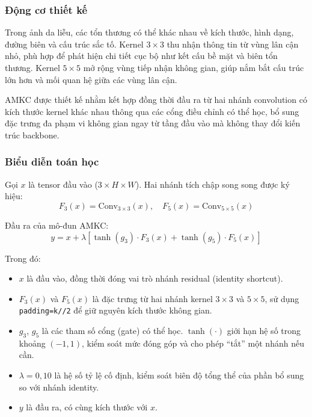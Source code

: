 \subsubsection{Động cơ thiết kế}

Trong ảnh da liễu, các tổn thương có thể khác nhau về kích thước, hình dạng, đường biên và cấu trúc sắc tố. Kernel $3\times3$ thu nhận thông tin từ vùng lân cận nhỏ, phù hợp để phát hiện chi tiết cục bộ như kết cấu bề mặt và biên tổn thương. Kernel $5\times5$ mở rộng vùng tiếp nhận không gian, giúp nắm bắt cấu trúc lớn hơn và mối quan hệ giữa các vùng lân cận.

AMKC được thiết kế nhằm kết hợp đồng thời đầu ra từ hai nhánh convolution có kích thước kernel khác nhau thông qua các cổng điều chỉnh có thể học, bổ sung đặc trưng đa phạm vi không gian ngay từ tầng đầu vào mà không thay đổi kiến trúc backbone.

\subsubsection{Biểu diễn toán học}

Gọi $x$ là tensor đầu vào ($3\times H\times W$). Hai nhánh tích chập song song được ký hiệu:
\begin{equation}
  F_3(x)=\mathrm{Conv}_{3\times3}(x), \quad F_5(x)=\mathrm{Conv}_{5\times5}(x)
\end{equation}

Đầu ra của mô-đun AMKC:
\begin{equation}
  y=x+\lambda\left[\tanh(g_3)\cdot F_3(x)+\tanh(g_5)\cdot F_5(x)\right]
  \label{eq:amkc}
\end{equation}

Trong đó:
\begin{itemize}
  \item $x$ là đầu vào, đồng thời đóng vai trò nhánh residual (identity shortcut).
  \item $F_3(x)$ và $F_5(x)$ là đặc trưng từ hai nhánh kernel $3\times3$ và $5\times5$, sử dụng \texttt{padding=k//2} để giữ nguyên kích thước không gian.
  \item $g_3$, $g_5$ là các tham số cổng (gate) có thể học. $\tanh(\cdot)$ giới hạn hệ số trong khoảng $(-1,1)$, kiểm soát mức đóng góp và cho phép ``tắt'' một nhánh nếu cần.
  \item $\lambda=0{,}10$ là hệ số tỷ lệ cố định, kiểm soát biên độ tổng thể của phần bổ sung so với nhánh identity.
  \item $y$ là đầu ra, có cùng kích thước với $x$.
\end{itemize}

